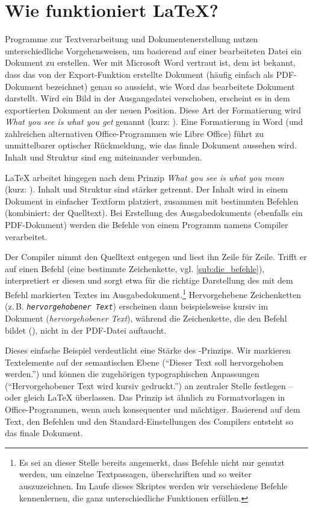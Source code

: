 \section{Wie funktioniert \LaTeX?}
\label{sec:wie_funktioniert_latex_}

Programme zur Textverarbeitung und Dokumentenerstellung nutzen unterschiedliche Vorgehensweisen, um basierend auf einer bearbeiteten Datei ein Dokument zu erstellen.
Wer mit Microsoft Word vertraut ist, dem ist bekannt, dass das von der Export-Funktion erstellte Dokument (häufig einfach als PDF-Dokument bezeichnet) genau so aussieht, wie Word das bearbeitete Dokument darstellt.
Wird ein Bild in der Ausgangsdatei verschoben, erscheint es in dem exportierten Dokument an der neuen Position.
Diese Art der Formatierung wird \emph{What you see is what you get} genannt (kurz: ).
Eine Formatierung in Word (und zahlreichen alternativen Office-Programmen wie Libre Office) führt zu unmittelbarer optischer Rückmeldung, wie das finale Dokument aussehen wird. 
Inhalt und Struktur sind eng miteinander verbunden.

\LaTeX{} arbeitet hingegen nach dem Prinzip \emph{What you see is what you mean} (kurz: ). 
Inhalt und Struktur sind stärker getrennt.
Der Inhalt wird in einem Dokument in einfacher Textform platziert, zusammen mit bestimmten Befehlen (kombiniert: der Quelltext).
Bei Erstellung des Ausgabedokuments (ebenfalls ein PDF-Dokument) werden die Befehle von einem Programm namens Compiler verarbeitet.

Der Compiler nimmt den Quelltext entgegen und liest ihn Zeile für Zeile.
Trifft er auf einen Befehl (eine bestimmte Zeichenkette, vgl. \cref{sub:die_befehle}), interpretiert er diesen und sorgt etwa für die richtige Darstellung des mit dem Befehl markierten Textes im Ausgabedokument.\footnote{Es sei an dieser Stelle bereits angemerkt, dass Befehle nicht nur genutzt werden, um einzelne Textpassagen, überschriften und so weiter auszuzeichnen. Im Laufe dieses Skriptes werden wir verschiedene Befehle kennenlernen, die ganz unterschiedliche Funktionen erfüllen.}
Hervorgehebene Zeichenketten (z.\,B. \texttt{\emph{hervorgehobener Text}}) erscheinen dann beispielsweise kursiv im Dokument (\emph{hervorgehobener Text}), während die Zeichenkette, die den Befehl bildet (\texttt{\emph{}}), nicht in der PDF-Datei auftaucht.

Dieses einfache Beispiel verdeutlicht eine Stärke des -Prinzips. 
Wir markieren Textelemente auf der semantischen Ebene (\enquote{Dieser Text soll hervorgehoben werden.}) und können die zugehörigen typographischen Anpassungen (\enquote{Hervorgehobener Text wird kursiv gedruckt.}) an zentraler Stelle festlegen -- oder gleich \LaTeX{} überlassen.
Das Prinzip ist ähnlich zu Formatvorlagen in Office-Programmen, wenn auch konsequenter und mächtiger.
Basierend auf dem Text, den Befehlen und den Standard-Einstellungen des Compilers entsteht so das finale Dokument.

